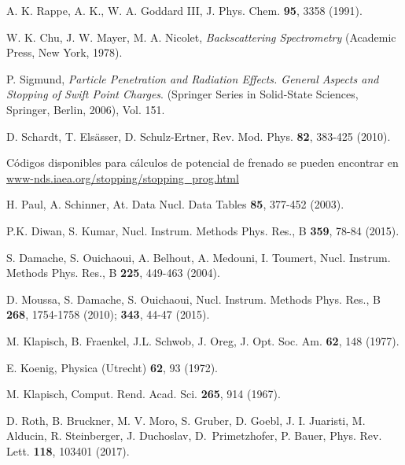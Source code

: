 \begin{thebibliography}{9}
A. K. Rappe, A. K., W. A. Goddard III,
J. Phys. Chem. \textbf{95}, 3358 (1991).




W. K. Chu, J. W. Mayer, M. A. Nicolet,
\textit{Backscattering Spectrometry}
(Academic Press, New York, 1978).

P. Sigmund, 
\textit{Particle Penetration and Radiation Effects. General Aspects and 
Stopping of Swift Point Charges}.
(Springer Series in Solid-State Sciences, Springer, Berlin, 2006), Vol. 151.

D. Schardt, T. Els\"asser, D. Schulz-Ertner, 
Rev. Mod. Phys. \textbf{82},  383-425 (2010).

Códigos disponibles para cálculos de potencial de frenado se pueden 
encontrar en \href{https://www-nds.iaea.org/stopping/stopping\_prog.html}
{www-nds.iaea.org/stopping/stopping\_prog.html}

H. Paul, A. Schinner,
At. Data Nucl. Data Tables  \textbf{85}, 377-452 (2003).

P.K. Diwan, S. Kumar, 
Nucl. Instrum. Methods Phys. Res., B \textbf{359}, 78-84 (2015).

S. Damache, S. Ouichaoui, A. Belhout, A. Medouni, I. Toumert, 
Nucl. Instrum. Methods Phys. Res., B \textbf{225}, 449-463 (2004).

D. Moussa, S. Damache, S. Ouichaoui, 
Nucl. Instrum. Methods Phys. Res., B \textbf{268}, 1754-1758 (2010); 
\textbf{343},  44-47 (2015).

M. Klapisch, B. Fraenkel, J.L. Schwob, J. Oreg,
J. Opt. Soc. Am. \textbf{62}, 148 (1977).

E. Koenig,
Physica (Utrecht) \textbf{62}, 93 (1972).

M. Klapisch,
Comput. Rend. Acad. Sci. \textbf{265}, 914 (1967).

D. Roth, B. Bruckner, M. V. Moro, S. Gruber, D. Goebl, J. I. Juaristi,
M. Alducin, R. Steinberger, J. Duchoslav, \mbox{D. Primetzhofer}, P. Bauer,
Phys. Rev. Lett. \textbf{118}, 103401 (2017).


\end{thebibliography}
